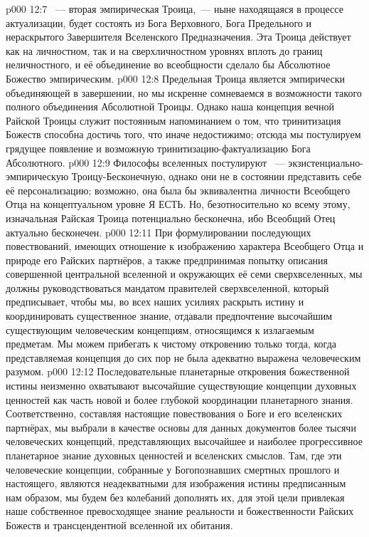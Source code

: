 \vs p000 12:7 ~--- вторая эмпирическая Троица,~--- ныне находящаяся в процессе актуализации, будет состоять из Бога Верховного, Бога Предельного и нераскрытого Завершителя Вселенского Предназначения. Эта Троица действует как на личностном, так и на сверхличностном уровнях вплоть до границ неличностного, и её объединение во всеобщности сделало бы Абсолютное Божество эмпирическим.
\vs p000 12:8 \pc Предельная Троица является эмпирически объединяющей в завершении, но мы искренне сомневаемся в возможности такого полного объединения Абсолютной Троицы. Однако наша концепция вечной Райской Троицы служит постоянным напоминанием о том, что тринитизация Божеств способна достичь того, что иначе недостижимо; отсюда мы постулируем грядущее появление  и возможную тринитизацию\hyp{}фактуализацию Бога Абсолютного.
\vs p000 12:9 \pc Философы вселенных постулируют ~--- экзистенциально\hyp{}эмпирическую Троицу\hyp{}Бесконечную, однако они не в состоянии представить себе её персонализацию; возможно, она была бы эквивалентна личности Всеобщего Отца на концептуальном уровне Я ЕСТЬ. Но, безотносительно ко всему этому, изначальная Райская Троица потенциально бесконечна, ибо Всеобщий Отец актуально бесконечен.
\vs p000 12:11 При формулировании последующих повествований, имеющих отношение к изображению характера Всеобщего Отца и природе его Райских партнёров, а также предпринимая попытку описания совершенной центральной вселенной и окружающих её семи сверхвселенных, мы должны руководствоваться мандатом правителей сверхвселенной, который предписывает, чтобы мы, во всех наших усилиях раскрыть истину и координировать существенное знание, отдавали предпочтение высочайшим существующим человеческим концепциям, относящимся к излагаемым предметам. Мы можем прибегать к чистому откровению только тогда, когда представляемая концепция до сих пор не была адекватно выражена человеческим разумом.
\vs p000 12:12 Последовательные планетарные откровения божественной истины неизменно охватывают высочайшие существующие концепции духовных ценностей как часть новой и более глубокой координации планетарного знания. Соответственно, составляя настоящие повествования о Боге и его вселенских партнёрах, мы выбрали в качестве основы для данных документов более тысячи человеческих концепций, представляющих высочайшее и наиболее прогрессивное планетарное знание духовных ценностей и вселенских смыслов. Там, где эти человеческие концепции, собранные у Богопознавших смертных прошлого и настоящего, являются неадекватными для изображения истины предписанным нам образом, мы будем без колебаний дополнять их, для этой цели привлекая наше собственное превосходящее знание реальности и божественности Райских Божеств и трансцендентной вселенной их обитания.

